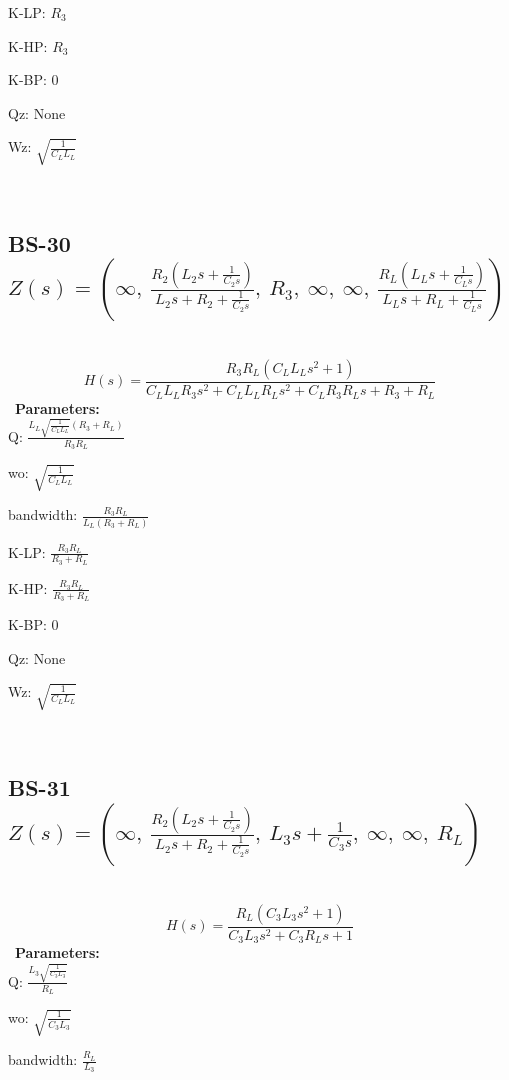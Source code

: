 \documentclass{article}
\begin{document}
K-LP: $R_{3}$\ 

K-HP: $R_{3}$\ 

K-BP: $0$\ 

Qz: $\text{None}$\ 

Wz: $\sqrt{\frac{1}{C_{L} L_{L}}}$\ 

\ 

\subsection{BS-30 $Z(s) = \left( \infty, \  \frac{R_{2} \left(L_{2} s + \frac{1}{C_{2} s}\right)}{L_{2} s + R_{2} + \frac{1}{C_{2} s}}, \  R_{3}, \  \infty, \  \infty, \  \frac{R_{L} \left(L_{L} s + \frac{1}{C_{L} s}\right)}{L_{L} s + R_{L} + \frac{1}{C_{L} s}}\right)$ } \ 
\textbf{\[H(s) = \frac{R_{3} R_{L} \left(C_{L} L_{L} s^{2} + 1\right)}{C_{L} L_{L} R_{3} s^{2} + C_{L} L_{L} R_{L} s^{2} + C_{L} R_{3} R_{L} s + R_{3} + R_{L}}\] } \ 
\textbf{Parameters:}\\ 

Q: $\frac{L_{L} \sqrt{\frac{1}{C_{L} L_{L}}} \left(R_{3} + R_{L}\right)}{R_{3} R_{L}}$\ 

wo: $\sqrt{\frac{1}{C_{L} L_{L}}}$\ 

bandwidth: $\frac{R_{3} R_{L}}{L_{L} \left(R_{3} + R_{L}\right)}$\ 

K-LP: $\frac{R_{3} R_{L}}{R_{3} + R_{L}}$\ 

K-HP: $\frac{R_{3} R_{L}}{R_{3} + R_{L}}$\ 

K-BP: $0$\ 

Qz: $\text{None}$\ 

Wz: $\sqrt{\frac{1}{C_{L} L_{L}}}$\ 

\ 

\subsection{BS-31 $Z(s) = \left( \infty, \  \frac{R_{2} \left(L_{2} s + \frac{1}{C_{2} s}\right)}{L_{2} s + R_{2} + \frac{1}{C_{2} s}}, \  L_{3} s + \frac{1}{C_{3} s}, \  \infty, \  \infty, \  R_{L}\right)$ } \ 
\textbf{\[H(s) = \frac{R_{L} \left(C_{3} L_{3} s^{2} + 1\right)}{C_{3} L_{3} s^{2} + C_{3} R_{L} s + 1}\] } \ 
\textbf{Parameters:}\\ 

Q: $\frac{L_{3} \sqrt{\frac{1}{C_{3} L_{3}}}}{R_{L}}$\ 

wo: $\sqrt{\frac{1}{C_{3} L_{3}}}$\ 

bandwidth: $\frac{R_{L}}{L_{3}}$\ 
\end{document}
